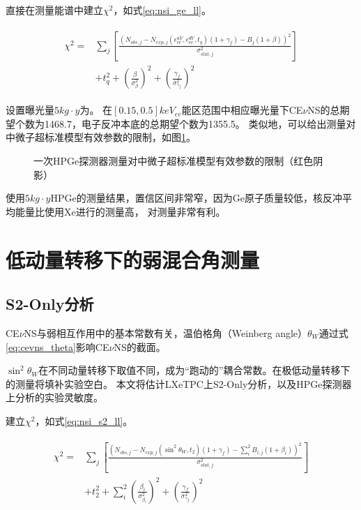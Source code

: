 直接在测量能谱中建立$\chi^2$，如式\ref{eq:nsi_ge_ll}。

\begin{align}
    \label{eq:nsi_ge_ll}
    \begin{split}
    \chi^2 =& \sum_j\left[\frac{\left(N_{obs,j} - N_{exp,j}(\epsilon^{uV}_{ee}, \epsilon^{dV}_{ee}, t_q)(1 + \gamma_f) 
    - B_{j}(1 + \beta)\right)^2}{\sigma^2_{stat,j}}\right] \\
    & + t_q^2 + (\frac{\beta}{\sigma^2_{\beta}})^2 + (\frac{\gamma_f}{\sigma^2_{\gamma_f}})^2
    \end{split}
\end{align}

设置曝光量$5\si{kg\cdot y}$为。
在$[0.15,0.5]\si{keV_{ee}}$能区范围中相应曝光量下CE$\nu$NS的总期望个数为1468.7，电子反冲本底的总期望个数为1355.5。
类似地，可以给出测量对中微子超标准模型有效参数的限制，如图\ref{fig:nsi_sensitivity_ge}。

\begin{figure}
  \centering
  
  \caption{\label{fig:nsi_sensitivity_ge} 一次HPGe探测器测量对中微子超标准模型有效参数的限制（红色阴影）}
\end{figure}

使用$5\si{kg\cdot y}$HPGe的测量结果，置信区间非常窄，因为$\mathrm{Ge}$原子质量较低，核反冲平均能量比使用$\mathrm{Xe}$进行的测量高，
对测量非常有利。

\section{低动量转移下的弱混合角测量}

\subsection{S2-Only分析}

CE$\nu$NS与弱相互作用中的基本常数有关，温伯格角（Weinberg angle）$\theta_W$通过式\ref{eq:cevns_theta}影响CE$\nu$NS的截面。

$\sin^2\theta_W$在不同动量转移下取值不同，成为``跑动的''耦合常数。在极低动量转移下的测量将填补实验空白。
本文将估计LXeTPC上S2-Only分析，以及HPGe探测器上分析的实验灵敏度。

建立$\chi^2$，如式\ref{eq:nsi_s2_ll}。

\begin{align}
    \label{eq:thets_s2_ll}
    \begin{split}
    \chi^2 =& \sum_j\left[\frac{\left(N_{obs,j} - N_{exp,j}(\sin^2\theta_W, t_2)(1 + \gamma_f) 
    - \sum_{i}^2 B_{i,j}(1 + \beta_i)\right)^2}{\sigma^2_{stat,j}}\right] \\
    & + t_2^2 + \sum_{i}^2(\frac{\beta_i}{\sigma^2_{\beta_i}})^2 + (\frac{\gamma_f}{\sigma^2_{\gamma_f}})^2
    \end{split}
\end{align}

